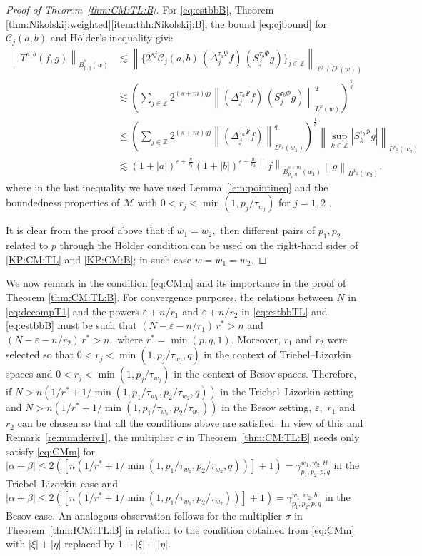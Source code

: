 \documentclass[10pt,a4paper]{article}
\theoremstyle{remark}
\newcommand{\ent}{\mathbb{Z}}
\newcommand{\C}{\mathcal{C}}
\newcommand{\M}{\mathcal{M}} %
\newcommand{\Do}[2]{\Delta^{#1}_{#2}}
\newcommand{\So}[2]{S^{#1}_{#2}}
\newcommand{\abs}[1]{\left\vert #1 \right\vert}
\newcommand{\norm}[2]{\left\|#1\right\|_{#2}}
\newcommand{\gamt}{\gamma_{p_1,p_2,p,q}^{w_1,w_2, tl}}
\newcommand{\gamb}{\gamma_{p_1,p_2,p,q}^{w_1,w_2,b}}
\begin{document}
\begin{proof}[Proof of Theorem~\ref{thm:CM:TL:B}]
For \eqref{eq:estbbB},  Theorem \ref{thm:Nikolskij:weighted}\eqref{item:thh:Nikolskij:B}, the bound \eqref{eq:cjbound} for $\C_j(a,b)$ and H\"older's inequality  give
\begin{align*}
\norm{T^{a,b}(f,g)}{\dot{B}^s_{p,q}(w)} & \lesssim \norm{\{2^{sj} \C_j(a,b) \,(\Do{ \tau_a \Psi }{j} f ) \, (\So{ \tau_b \Phi }{j} g)\}_{j\in\ent} }{\ell^q(L^p(w))}\\
& \lesssim \left(\sum\limits_{j \in \ent}  2^{(s +m) q j}  \norm{(\Do{ \tau_a \Psi }{j} f ) \, (\So{ \tau_b \Phi }{j} g)}{L^p(w)}^q   \right)^\frac{1}{q}  \\
&\le  \left(\sum\limits_{j \in \ent}  2^{(s +m) q j}  \norm{(\Do{ \tau_a \Psi }{j} f ) }{L^{p_1}(w_1)}^q   \right)^\frac{1}{q}  \norm{\sup_{k\in \ent}|\So{ \tau_b \Phi }{k} g|}{L^{p_2}(w_2)}\\
& \lesssim  (1+\abs{a})^{\varepsilon+\frac{n}{r_1}}  (1+\abs{b})^{\varepsilon+\frac{n}{r_2}}  \norm{f}{\dot{B}^{s+m}_{p_1, q}(w_1)} \norm{g}{H^{p_2}(w_2)},
\end{align*}
where in the last inequality we have used Lemma~\ref{lem:pointineq} and the boundedness properties of $\M$ with  $0<r_j<\min(1,p_j/\tau_{w_j})$ for $j=1,2$ .


It is clear from the proof above that if $w_1=w_2,$ then  different pairs of $p_1, p_2$ related to $p$ through the H\"older condition can be used on the right-hand sides of \eqref{KP:CM:TL} and \eqref{KP:CM:B}; in such case $w=w_1=w_2.$  
\end{proof}


We now remark in the condition \ref{eq:CMm} and its importance in the proof of Theorem \ref{thm:CM:TL:B}.
For convergence purposes, the relations between $N$ in \eqref{eq:decompT1} and the powers  $\varepsilon+n/r_1$ and $\varepsilon+n/r_2$ in \eqref{eq:estbbTL} and   \eqref{eq:estbbB} must be such that $(N-\varepsilon-n/r_1)\,r^*>n$ and $(N-\varepsilon-n/r_2)\,r^*>n,$ where $r^*=\min(p,q,1).$ Moreover,  $r_1$ and $r_2$ were selected so that $0<r_j<\min(1, p_j/\tau_{w_j},q)$ in the context of  Triebel--Lizorkin spaces and  $0<r_j<\min(1,p_j/\tau_{w_j})$ in the context of Besov spaces. Therefore, if  $N>n(1/r^*+1/\min(1, p_1/\tau_{w_1},p_2/\tau_{w_2},q))$ in the Triebel--Lizorkin setting and $N>n(1/r^*+1/\min(1, p_1/\tau_{w_1},p_2/\tau_{w_2}))$ in the Besov setting,  $\varepsilon,$  $r_1$ and  $r_2$ can be chosen so that all the conditions above are satisfied. In view of this and Remark~\ref{re:numderiv1},  the multiplier $\sigma$ in Theorem~\ref{thm:CM:TL:B}  needs only satisfy  \eqref{eq:CMm} for $\abs{\alpha+\beta}\le 2( [n(1/r^*+1/\min(1,p_1/\tau_{w_1},p_2/\tau_{w_2},q))]+1)=\gamt$ in the Triebel--Lizorkin case and $\abs{\alpha+\beta}\le 2( [n(1/r^*+1/\min(1, p_1/\tau_{w_1},p_2/\tau_{w_2}))]+1)=\gamb$ in the Besov case. An analogous observation follows for the multiplier $\sigma$ in Theorem~\ref{thm:ICM:TL:B} in relation to the condition  obtained from \eqref{eq:CMm} with $\abs{\xi}+\abs{\eta}$ replaced by $1+\abs{\xi}+\abs{\eta}.$ 
\end{document}
